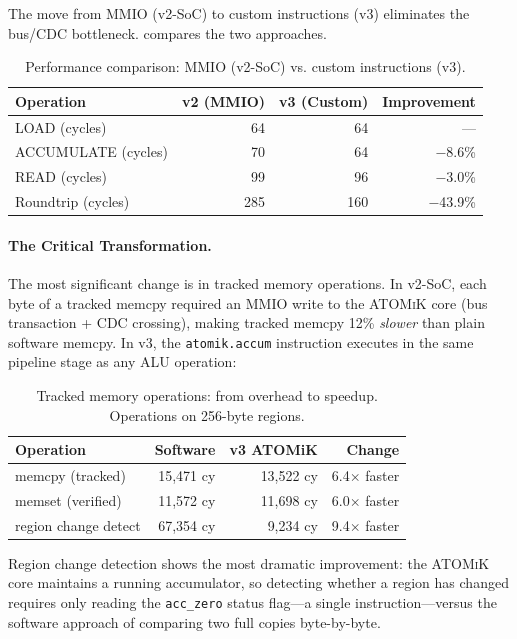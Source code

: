 \documentclass[11pt,letterpaper]{article}
\theoremstyle{plain}
\theoremstyle{definition}
\theoremstyle{remark}
\newcommand{\atomik}{\textsc{ATOMiK}}
\begin{document}
The move from MMIO (v2-SoC) to custom instructions (v3) eliminates the bus/CDC bottleneck.  compares the two approaches.

\begin{table}[!htbp]
\centering
\caption{Performance comparison: MMIO (v2-SoC) vs. custom instructions (v3).}
\label{tab:v3-perf}
\begin{tabular}{@{}lrrr@{}}
\toprule
\textbf{Operation} & \textbf{v2 (MMIO)} & \textbf{v3 (Custom)} & \textbf{Improvement} \\
\midrule
LOAD (cycles)       & 64  & 64  & --- \\
ACCUMULATE (cycles) & 70  & 64  & $-$8.6\% \\
READ (cycles)       & 99  & 96  & $-$3.0\% \\
Roundtrip (cycles)  & 285 & 160 & $-$43.9\% \\
\bottomrule
\end{tabular}
\end{table}

\paragraph{The Critical Transformation.} The most significant change is in tracked memory operations. In v2-SoC, each byte of a tracked memcpy required an MMIO write to the \atomik{} core (bus transaction + CDC crossing), making tracked memcpy 12\% \emph{slower} than plain software memcpy. In v3, the \texttt{atomik.accum} instruction executes in the same pipeline stage as any ALU operation:

\begin{table}[!htbp]
\centering
\caption{Tracked memory operations: from overhead to speedup. Operations on 256-byte regions.}
\label{tab:tracked-mem}
\begin{tabular}{@{}lrrr@{}}
\toprule
\textbf{Operation} & \textbf{Software} & \textbf{v3 ATOMiK} & \textbf{Change} \\
\midrule
memcpy (tracked)      & 15,471 cy & 13,522 cy & 6.4$\times$ faster \\
memset (verified)     & 11,572 cy & 11,698 cy & 6.0$\times$ faster \\
region change detect  & 67,354 cy &  9,234 cy & 9.4$\times$ faster \\
\bottomrule
\end{tabular}
\end{table}

Region change detection shows the most dramatic improvement: the \atomik{} core maintains a running accumulator, so detecting whether a region has changed requires only reading the \texttt{acc\_zero} status flag---a single instruction---versus the software approach of comparing two full copies byte-by-byte.
\end{document}
